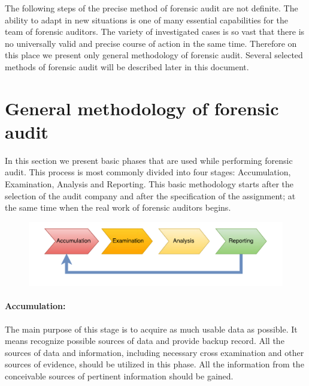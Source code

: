 The following steps of the precise method of forensic audit are not definite. The ability to adapt in new situations is one of many essential capabilities for the team of forensic auditors. The variety of investigated cases is so vast that there is no universally valid and precise course of action in the same time. Therefore on this place we present only general methodology of forensic audit. Several selected methods of forensic audit will be described later in this document. 

\section{General methodology of forensic audit}
In this section we present basic phases that are used while performing forensic audit. This process is most commonly divided into four stages: Accumulation, Examination, Analysis and Reporting. This basic methodology starts after the  selection of the audit company and after the specification of the assignment; at the same time when the real work of forensic auditors begins.

\begin{figure}[h]
	\begin{center} 
	\includegraphics[width=1.0\textwidth]{img/general_methodology.pdf}
	\end{center}
	\caption{}
\end{figure}

\paragraph{Accumulation:} 
The main purpose of this stage is to acquire as much usable data as possible. It means recognize possible sources of data and provide backup record. All the sources of data and information, including necessary cross examination and other sources of evidence, should be utilized in this phase. All the information from the conceivable sources of pertinent information should be gained.

